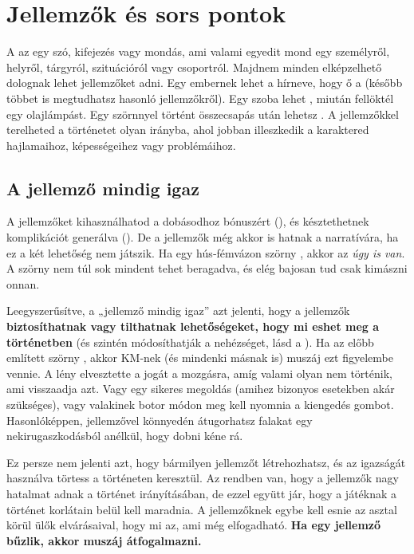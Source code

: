 \chapter{Jellemzők és sors pontok}

A  az egy szó, kifejezés vagy mondás, ami valami egyedit mond egy személyről, helyről, tárgyról, szituációról vagy csoportról. Majdnem minden elképzelhető dolognak lehet jellemzőket adni. Egy embernek lehet a hírneve, hogy ő a  (később többet is megtudhatsz hasonló jellemzőkről). Egy szoba lehet , miután fellöktél egy olajlámpást. Egy szörnnyel történt összecsapás után lehetsz . A jellemzőkkel terelheted a történetet olyan irányba, ahol jobban illeszkedik a karaktered hajlamaihoz, képességeihez vagy problémáihoz.

\section{A jellemző mindig igaz}

A jellemzőket kihasználhatod a dobásodhoz bónuszért (), és késztethetnek komplikációt generálva (). De a jellemzők még akkor is hatnak a narratívára, ha ez a két lehetőség nem játszik. Ha egy hús‑fémvázon szörny , akkor az \emph{úgy is van}. A szörny nem túl sok mindent tehet beragadva, és elég bajosan tud csak kimászni onnan.

Leegyszerűsítve, a „jellemző mindig igaz” azt jelenti, hogy a jellemzők \textbf{biztosíthatnak vagy tilthatnak lehetőségeket, hogy mi eshet meg a történetben} (és szintén módosíthatják a nehézséget, lásd a ). Ha az előbb említett szörny , akkor KM‑nek (és mindenki másnak is) muszáj ezt figyelembe vennie. A lény elvesztette a jogát a mozgásra, amíg valami olyan nem történik, ami visszaadja azt. Vagy egy sikeres megoldás (amihez bizonyos esetekben akár  szükséges), vagy valakinek botor módon meg kell nyomnia a kiengedés gombot. Hasonlóképpen,  jellemzővel könnyedén átugorhatsz falakat egy nekirugaszkodásból anélkül, hogy dobni kéne rá.

Ez persze nem jelenti azt, hogy bármilyen jellemzőt létrehozhatsz, és az igazságát használva törtess a történeten keresztül. Az rendben van, hogy a jellemzők nagy hatalmat adnak a történet irányításában, de ezzel együtt jár, hogy a játéknak a történet korlátain belül kell maradnia. A jellemzőknek egybe kell esnie az asztal körül ülők elvárásaival, hogy mi az, ami még elfogadható. \textbf{Ha egy jellemző bűzlik, akkor muszáj átfogalmazni.}

